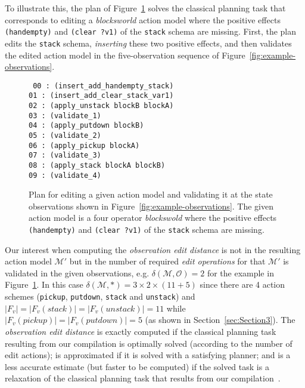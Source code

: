 \documentclass[3p,times]{elsarticle}
\begin{document}
To illustrate this, the plan of Figure~\ref{fig:plan-odistance} solves the classical planning task that corresponds to editing a \emph{blocksworld} action model where the positive effects {\tt\small (handempty)} and {\tt\small (clear ?v1)} of the {\tt\small stack} schema are missing. First, the plan edits the {\tt\small stack} schema, {\em inserting} these two positive effects, and then validates the edited action model in the five-observation sequence of Figure~\ref{fig:example-observations}.

\begin{figure}[hbt!]
{\tt\small
00 : (insert\_add\_handempty\_stack)\\
01 : (insert\_add\_clear\_stack\_var1)\\
02 : (apply\_unstack blockB blockA)\\
03 : (validate\_1)\\
04 : (apply\_putdown blockB)\\
05 : (validate\_2)\\
06 : (apply\_pickup blockA)\\
07 : (validate\_3)\\
08 : (apply\_stack blockA blockB)\\
09 : (validate\_4)\\
}
\caption{\small Plan for editing a given action model and validating it at the state observations shown in Figure~\ref{fig:example-observations}. The given action model is a four operator {\em blockswold} where the positive effects {\tt\small (handempty)} and {\tt\small (clear ?v1)} of the {\tt\small stack} schema are missing.}
\label{fig:plan-odistance}
\end{figure}

Our interest when computing the {\em observation edit distance} is not in the resulting action model $\mathcal{M}'$ but in the number of required {\em edit operations} for that $\mathcal{M}'$ is validated in the given observations, e.g. $\delta(\mathcal{M},\mathcal{O})=2$ for the example in Figure~\ref{fig:plan-odistance}. In this case $\delta(\mathcal{M},*)=3\times 2\times (11+5)$ since there are 4 action schemes ({\small\tt pickup}, {\small\tt putdown}, {\small\tt stack} and {\small\tt unstack}) and $|F_v|=|F_v(stack)|=|F_v(unstack)|=11$ while $|F_v(pickup)|=|F_v(putdown)|=5$  (as shown in Section~\ref{sec:Section3}). The {\em observation edit distance} is exactly computed if the classical planning task resulting from our compilation is optimally solved (according to the number of edit actions); is approximated if it is solved with a satisfying planner; and is a less accurate estimate (but faster to be computed) if the solved task is a relaxation of the classical planning task that results from our compilation~\cite{bonet2001planning}.
\end{document}
